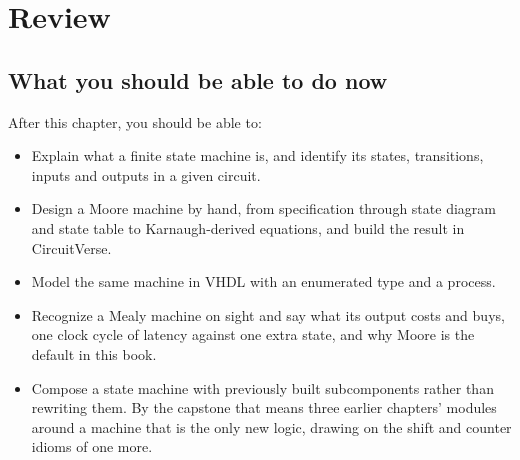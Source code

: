 
\section{Review}
\label{c8:sec:review}

\subsection*{What you should be able to do now}
After this chapter, you should be able to:
\begin{itemize}
  \item Explain what a finite state machine is, and identify its states, transitions, inputs and
    outputs in a given circuit.
  \item Design a Moore machine by hand, from specification through state diagram and state table to
    Karnaugh-derived equations, and build the result in CircuitVerse.
  \item Model the same machine in VHDL with an enumerated  type and a 
    process.
  \item Recognize a Mealy machine on sight and say what its output costs and buys, one clock cycle
    of latency against one extra state, and why Moore is the default in this book.
  \item Compose a state machine with previously built subcomponents rather than rewriting them. By
    the capstone that means three earlier chapters' modules around a machine that is the only new
    logic, drawing on the shift and counter idioms of one more.
\end{itemize}

